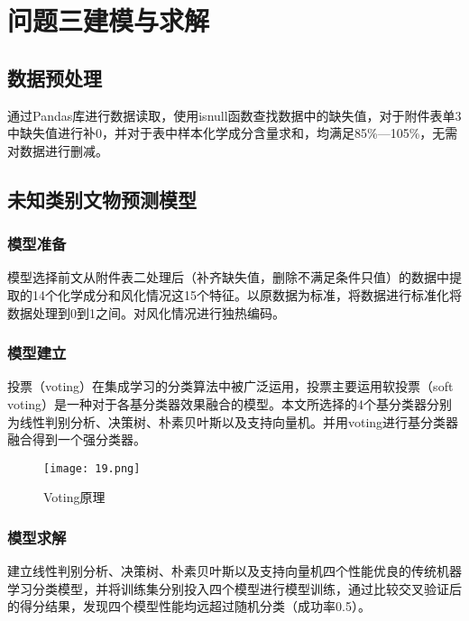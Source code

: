 \section{问题三建模与求解}

\subsection{数据预处理}

通过Pandas库进行数据读取，使用isnull函数查找数据中的缺失值，对于附件表单3中缺失值进行补0，并对于表中样本化学成分含量求和，均满足85\%—105\%，无需对数据进行删减。

\subsection{未知类别文物预测模型}

\subsubsection{模型准备}

模型选择前文从附件表二处理后（补齐缺失值，删除不满足条件只值）的数据中提取的14个化学成分和风化情况这15个特征。以原数据为标准，将数据进行标准化将数据处理到0到1之间。对风化情况进行独热编码。

\subsubsection{模型建立}

投票（voting）在集成学习的分类算法中被广泛运用，投票主要运用软投票（soft voting）是一种对于各基分类器效果融合的模型。本文所选择的4个基分类器分别为线性判别分析、决策树、朴素贝叶斯以及支持向量机。并用voting进行基分类器融合得到一个强分类器。

\begin{figure}[H] 
	\centering %
	\texttt{[image: 19.png]} %
	\caption{Voting原理} %
	\label{Fig.main20} %
\end{figure}



\subsubsection{模型求解}

建立线性判别分析、决策树、朴素贝叶斯以及支持向量机四个性能优良的传统机器学习分类模型，并将训练集分别投入四个模型进行模型训练，通过比较交叉验证后的得分结果，发现四个模型性能均远超过随机分类（成功率0.5）。


